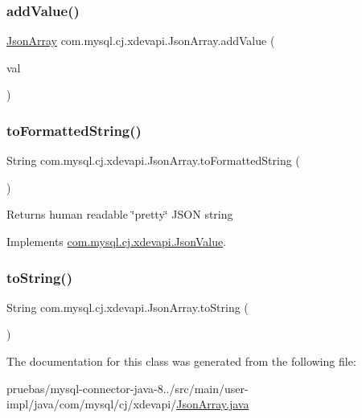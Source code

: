 \subsubsection{\texorpdfstring{add\+Value()}{addValue()}}
{\footnotesize\ttfamily \mbox{\hyperlink{classcom_1_1mysql_1_1cj_1_1xdevapi_1_1_json_array}{Json\+Array}} com.\+mysql.\+cj.\+xdevapi.\+Json\+Array.\+add\+Value (\begin{DoxyParamCaption}\item[{\mbox{\hyperlink{interfacecom_1_1mysql_1_1cj_1_1xdevapi_1_1_json_value}{Json\+Value}}}]{val }\end{DoxyParamCaption})}

\mbox{\label{classcom_1_1mysql_1_1cj_1_1xdevapi_1_1_json_array_a8a735ca15493e8154b46976ffb56204e}} 
\subsubsection{\texorpdfstring{to\+Formatted\+String()}{toFormattedString()}}
{\footnotesize\ttfamily String com.\+mysql.\+cj.\+xdevapi.\+Json\+Array.\+to\+Formatted\+String (\begin{DoxyParamCaption}{ }\end{DoxyParamCaption})}

\begin{DoxyReturn}{Returns}
human readable \char`\"{}pretty\char`\"{} J\+S\+ON string 
\end{DoxyReturn}


Implements \mbox{\hyperlink{interfacecom_1_1mysql_1_1cj_1_1xdevapi_1_1_json_value_aed42bf9ff63b3cd329cb1fabcf9dfe41}{com.\+mysql.\+cj.\+xdevapi.\+Json\+Value}}.

\mbox{\label{classcom_1_1mysql_1_1cj_1_1xdevapi_1_1_json_array_ac8d01d1367f93b168dd760316a66d5fc}} 
\subsubsection{\texorpdfstring{to\+String()}{toString()}}
{\footnotesize\ttfamily String com.\+mysql.\+cj.\+xdevapi.\+Json\+Array.\+to\+String (\begin{DoxyParamCaption}{ }\end{DoxyParamCaption})}



The documentation for this class was generated from the following file\+:\begin{DoxyCompactItemize}
\item 
pruebas/mysql-\/connector-\/java-\/8../src/main/user-\/impl/java/com/mysql/cj/xdevapi/\mbox{\hyperlink{_json_array_8java}{Json\+Array.\+java}}\end{DoxyCompactItemize}
